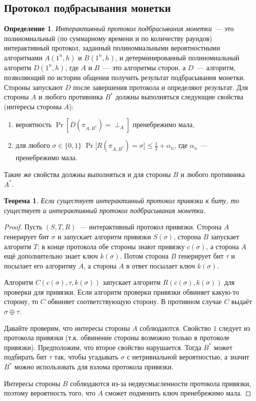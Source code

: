 \documentclass[12pt,a4paper]{article}
\newcommand{\bits}{\{0,1\}}
\theoremstyle{definition}
\newtheorem{definition}{Определение}[section]
\theoremstyle{plain}
\newtheorem{theorem}{Теорема}[section]
\theoremstyle{remark}
\begin{document}
\subsection{Протокол подбрасывания монетки}
\begin{definition}
\emph{Интерактивный протокол подбрасывания монетки}~--- это полиномиальный 
(по суммарному времени и по количеству раундов)
интерактивный протокол, заданный полиномиальными вероятностными алгоритмами 
$A(1^n, h)$ и $B(1^n, h)$, и детерминированный полиномиальный алгоритм $D(1^n, h)$,
где $A$ и $B$~--- это алгоритмы сторон, а $D$~--- алгоритм, 
позволяющий по истории общения получить результат подбрасывания монетки.
Стороны запускают $D$ после завершения протокола и определяют результат.
Для стороны $A$ и любого противника $B^*$ должны выполняться следующие свойства (интересы стороны $A$):
\begin{enumerate}
\item вероятность $\Pr[D(\pi_{A, B^*}) = \perp_A]$ пренебрежимо мала,
\item для любого $\sigma\in\bits$ $\Pr\bigl[R(\pi_{A, B^*}) = \sigma]\le\frac12 + \alpha_n$, где $\alpha_n$~--- пренебрежимо мала.
\end{enumerate}
Такие же свойства должны выполняться и для стороны $B$ и любого противника $A^*$.
\end{definition}
\begin{theorem}
Если существует интерактивный протокол привязки к биту, 
то существует и интерактивный протокол подбрасывания монетки.
\end{theorem}
\begin{proof}
Пусть $(S,T,R)$~--- интерактивный протокол привязки.
Сторона $A$ генерирует бит $\sigma$ и запускает алгоритм привязки $S(\sigma)$,
сторона $B$ запускает алгоритм $T$; в конце протокола обе стороны знают привязку $c(\sigma)$,
а сторона $A$ ещё дополнительно знает ключ $k(\sigma)$. 
Потом сторона $B$ генерирует бит $\tau$ и посылает его алгоритму $A$, а сторона $A$ в ответ посылает
ключ $k(\sigma)$.

Алгоритм $C(c(\sigma), \tau, k(\sigma))$ запускает алгоритм $R(c(\sigma), k(\sigma))$ 
для проверки для привязки.
Если алгоритм проверки привязки обвиняет какую-то сторону, то $C$ обвиняет соответствующую сторону.
В противном случае $C$ выдаёт $\sigma\oplus\tau$.

Давайте проверим, что интересы стороны $A$ соблюдаются. Свойство $1$ следует из протокола привязки
(т.к. обвинение стороны возможно только в протоколе привязки). 
Предположим, что второе свойство нарушается. Тогда $B^*$ может подбирать бит $\tau$ так,
чтобы угадывать $\sigma$ с нетривиальной вероятностью, а значит $B^*$ можно использовать 
для взлома протокола привязки.

Интересы стороны $B$ соблюдаются из-за недвусмысленности протокола привязки,
поэтому вероятность того, что $A$ сможет подменить ключ пренебрежимо мала.
\end{proof}
\end{document}
